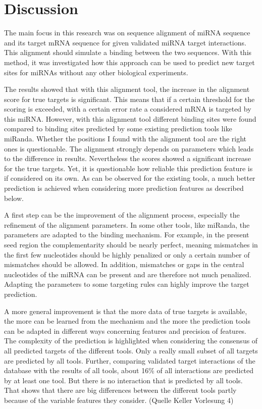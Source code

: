 \documentclass[12pt]{article}
\begin{document}
\section{Discussion}

The main focus in this research was on sequence alignment of miRNA sequence and its target mRNA sequence for given validated miRNA target interactions. This alignment should simulate a binding between the two sequences. With this method, it was investigated how this approach can be used to predict new target sites for miRNAs without any other biological experiments.

The results showed that with this alignment tool, the increase in the alignment score for true targets is significant. This means that if a certain threshold for the scoring is exceeded, with a certain error rate a considered mRNA is targeted by this miRNA. However, with this alignment tool different binding sites were found compared to binding sites predicted by some existing prediction tools like miRanda. Whether the positions I found with the alignment tool are the right ones is questionable. The alignment strongly depends on parameters which leads to the difference in results. Nevertheless the scores showed a significant increase for the true targets. Yet, it is questionable how reliable this prediction feature is if considered on its own. As can be observed for the existing tools, a much better prediction is achieved when considering more prediction features as described below.

A first step can be the improvement of the alignment process, especially the refinement of the alignment parameters. In some other tools, like miRanda, the parameters are adapted to the binding mechanism. For example, in the present seed region the complementarity should be nearly perfect, meaning mismatches in the first few nucleotides should be highly penalized or only a certain number of mismatches should be allowed. In addition, mismatches or gaps in the central nucleotides of the miRNA can be present and are therefore not much penalized. Adapting the parameters to some targeting rules can highly improve the target prediction. 

A more general improvement is that the more data of true targets is available, the more can be learned from the mechanism and the more the prediction tools can be adapted in different ways concerning features and precision of features.
The complexity of the prediction is highlighted when considering the consensus of all predicted targets of the different tools. Only a really small subset of all targets are predicted by all tools. Further, comparing validated target interactions of the database with the results of all tools, about 16\% of all interactions are predicted by at least one tool. But there is no interaction that is predicted by all tools. That shows that there are big differences between the different tools partly because of the variable features they consider. (Quelle Keller Vorlesung 4) 
\end{document}
